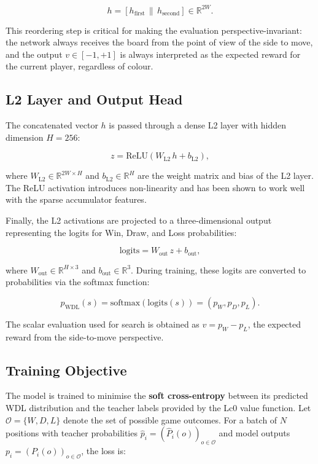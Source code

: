 \[
h = [h_{\text{first}} \, \| \, h_{\text{second}}] \in \mathbb{R}^{2W}.
\]

This reordering step is critical for making the evaluation perspective-invariant: the network always receives the board from the point of view of the side to move, and the output $v \in [-1, +1]$ is always interpreted as the expected reward for the current player, regardless of colour.

\subsection{L2 Layer and Output Head}

The concatenated vector $h$ is passed through a dense L2 layer with hidden dimension $H = 256$:

\[
z = \text{ReLU}(W_{\text{L2}} \, h + b_{\text{L2}}),
\]

where $W_{\text{L2}} \in \mathbb{R}^{2W \times H}$ and $b_{\text{L2}} \in \mathbb{R}^H$ are the weight matrix and bias of the L2 layer. The ReLU activation introduces non-linearity and has been shown to work well with the sparse accumulator features.

Finally, the L2 activations are projected to a three-dimensional output representing the logits for Win, Draw, and Loss probabilities:

\[
\text{logits} = W_{\text{out}} \, z + b_{\text{out}},
\]

where $W_{\text{out}} \in \mathbb{R}^{H \times 3}$ and $b_{\text{out}} \in \mathbb{R}^3$. During training, these logits are converted to probabilities via the softmax function:

\[
p_{\text{WDL}}(s) = \text{softmax}(\text{logits}(s)) = (p_W, p_D, p_L).
\]

The scalar evaluation used for search is obtained as $v = p_W - p_L$, the expected reward from the side-to-move perspective.

\subsection{Training Objective}

The model is trained to minimise the \textbf{soft cross-entropy} between its predicted WDL distribution and the teacher labels provided by the Lc0 value function. Let $\mathcal{O} = \{W, D, L\}$ denote the set of possible game outcomes. For a batch of $N$ positions with teacher probabilities $\hat{p}_i = (\hat{P}_i(o))_{o \in \mathcal{O}}$ and model outputs $p_i = (P_i(o))_{o \in \mathcal{O}}$, the loss is:

